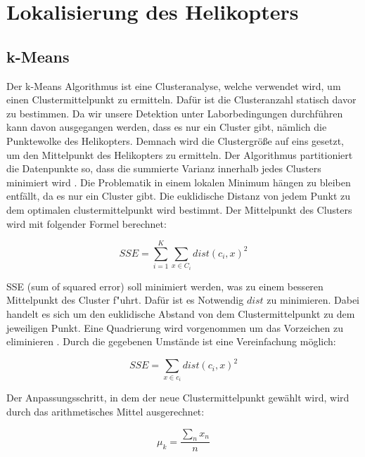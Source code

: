 \section{Lokalisierung des Helikopters} 
\label{sec:lokalisierung}

\subsection{k-Means}
\label{subsec:kmeans}

Der k-Means Algorithmus ist eine Clusteranalyse, welche verwendet wird, um einen Clustermittelpunkt zu ermitteln. Dafür ist die Clusteranzahl statisch davor zu bestimmen. Da wir unsere Detektion unter Laborbedingungen durchführen kann davon ausgegangen werden, dass es nur ein Cluster gibt, nämlich die Punktewolke des Helikopters. Demnach wird die Clustergröße auf eins gesetzt, um den Mittelpunkt des Helikopters zu ermitteln. {Der Algorithmus partitioniert die Datenpunkte so, dass die summierte Varianz innerhalb jedes Clusters minimiert wird} \cite{KM}.\newline
\noindent Die Problematik in einem lokalen Minimum hängen zu bleiben entfällt, da es nur ein Cluster gibt. Die euklidische Distanz von jedem Punkt zu dem optimalen clustermittelpunkt wird bestimmt. Der Mittelpunkt des Clusters wird mit folgender Formel berechnet:

\begin{equation}
SSE=\sum_{i=1}^K \sum_{x \in C_i} dist(c_i, x)^{2}
\end{equation}

\noindent SSE (sum of squared error) soll minimiert werden, was zu einem besseren Mittelpunkt des Cluster f"uhrt. Dafür ist es Notwendig $dist$ zu minimieren. Dabei
handelt es sich um den euklidische Abstand von dem Clustermittelpunkt zu dem jeweiligen Punkt. Eine Quadrierung wird vorgenommen um das Vorzeichen zu eliminieren \cite{TUM}. Durch die gegebenen Umstände ist eine Vereinfachung möglich:\newline

\begin{equation}
SSE=\sum_{x \in c_i} dist(c_i, x)^{2}
\end{equation}

\noindent Der Anpassungsschritt, in dem der neue Clustermittelpunkt gewählt wird, wird durch das arithmetisches Mittel ausgerechnet:

\begin{equation}
\mu_k = \dfrac{\sum_{n}x_{n}}{n}
\end{equation}

